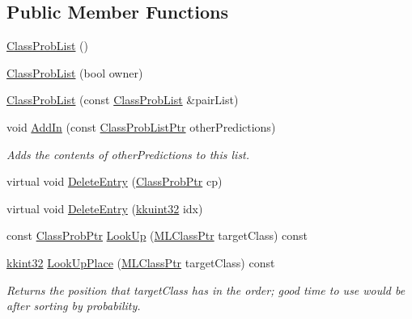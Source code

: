 \subsection*{Public Member Functions}
\begin{DoxyCompactItemize}
\item 
\hyperlink{class_k_k_m_l_l_1_1_class_prob_list_a74c3cf974e8d4c07b03c3e07772fa0f7}{Class\+Prob\+List} ()
\item 
\hyperlink{class_k_k_m_l_l_1_1_class_prob_list_a73e845ee1b7c6495bb7e58fb1bc3578f}{Class\+Prob\+List} (bool owner)
\item 
\hyperlink{class_k_k_m_l_l_1_1_class_prob_list_a92fad6b2d4778df82dcd953246123870}{Class\+Prob\+List} (const \hyperlink{class_k_k_m_l_l_1_1_class_prob_list}{Class\+Prob\+List} \&pair\+List)
\item 
void \hyperlink{class_k_k_m_l_l_1_1_class_prob_list_a98fdb0e8bfe0b2f4509065a44fe23da7}{Add\+In} (const \hyperlink{class_k_k_m_l_l_1_1_class_prob_list_ae410f9bc9ad2f68c9587ec2ceedb82bd}{Class\+Prob\+List\+Ptr} other\+Predictions)
\begin{DoxyCompactList}\small\item\em Adds the contents of \textquotesingle{}other\+Predictions\textquotesingle{} to this list. \end{DoxyCompactList}\item 
virtual void \hyperlink{class_k_k_m_l_l_1_1_class_prob_list_adfa441f1001b7f7e4ab654f255e664eb}{Delete\+Entry} (\hyperlink{namespace_k_k_m_l_l_aac4f1402b049fe046f3fa6c789a0c5d0}{Class\+Prob\+Ptr} cp)
\item 
virtual void \hyperlink{class_k_k_m_l_l_1_1_class_prob_list_a489505043d555ef97b5dca594a4e48ce}{Delete\+Entry} (\hyperlink{namespace_k_k_b_af8d832f05c54994a1cce25bd5743e19a}{kkuint32} idx)
\item 
const \hyperlink{namespace_k_k_m_l_l_aac4f1402b049fe046f3fa6c789a0c5d0}{Class\+Prob\+Ptr} \hyperlink{class_k_k_m_l_l_1_1_class_prob_list_a67c190400adf2ac84dffec9bac2706ef}{Look\+Up} (\hyperlink{namespace_k_k_m_l_l_ac272393853d59e72e8456f14cd6d8c23}{M\+L\+Class\+Ptr} target\+Class) const 
\item 
\hyperlink{namespace_k_k_b_a8fa4952cc84fda1de4bec1fbdd8d5b1b}{kkint32} \hyperlink{class_k_k_m_l_l_1_1_class_prob_list_a2161d5786a1c350375b0fb0e3b29e676}{Look\+Up\+Place} (\hyperlink{namespace_k_k_m_l_l_ac272393853d59e72e8456f14cd6d8c23}{M\+L\+Class\+Ptr} target\+Class) const 
\begin{DoxyCompactList}\small\item\em Returns the position that \textquotesingle{}target\+Class\textquotesingle{} has in the order; good time to use would be after sorting by probability. \end{DoxyCompactList}\item 

\end{DoxyCompactItemize}
